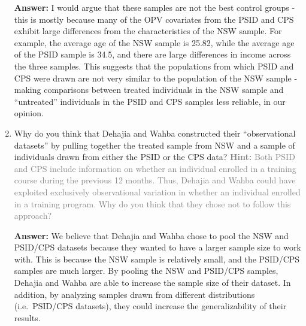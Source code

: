 \documentclass[
]{article}
\begin{document}
\begin{enumerate}
  \textbf{Answer:} I would argue that these samples are not the best
  control groups - this is mostly because many of the OPV covariates
  from the PSID and CPS exhibit large differences from the
  characteristics of the NSW sample. For example, the average age of the
  NSW sample is 25.82, while the average age of the PSID sample is 34.5,
  and there are large differences in income across the three samples.
  This suggests that the populations from which PSID and CPS were drawn
  are not very similar to the population of the NSW sample - making
  comparisons between treated individuals in the NSW sample and
  ``untreated'' individuals in the PSID and CPS samples less reliable,
  in our opinion.
\item
  Why do you think that Dehajia and Wahba constructed their
  ``observational datasets'' by pulling together the treated sample from
  NSW and a sample of individuals drawn from either the PSID or the CPS
  data?
  \textcolor{gray}{\textbf{Hint:} Both PSID and CPS include information on whether an individual enrolled in a training course during the previous 12 months. Thus, Dehajia and Wahba could have exploited exclusively observational variation in whether an individual enrolled in a training program. Why do you think that they chose not to follow this approach?}

  \textbf{Answer:} We believe that Dehajia and Wahba chose to pool the
  NSW and PSID/CPS datasets because they wanted to have a larger sample
  size to work with. This is because the NSW sample is relatively small,
  and the PSID/CPS samples are much larger. By pooling the NSW and
  PSID/CPS samples, Dehajia and Wahba are able to increase the sample
  size of their dataset. In addition, by analyzing samples drawn from
  different distributions (i.e.~PSID/CPS datasets), they could increase
  the generalizability of their results.
\end{enumerate}



\pagebreak
\end{document}
